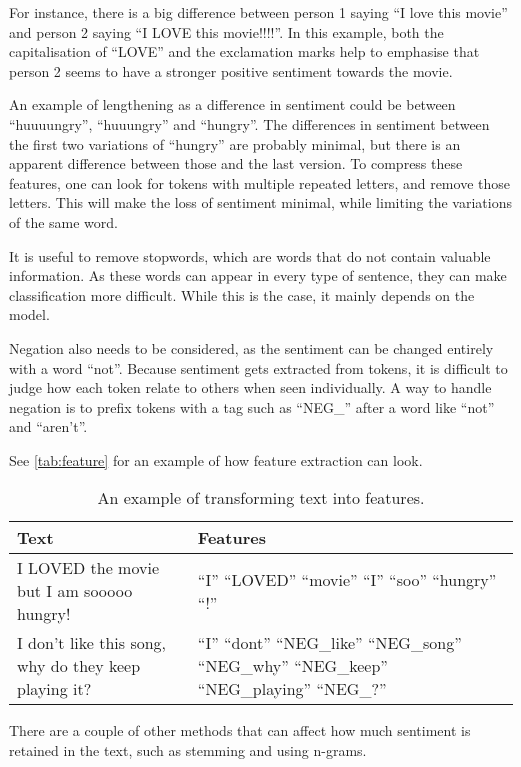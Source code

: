 For instance, there is a big difference between person 1 saying ``I love this
movie'' and person 2 saying ``I LOVE this movie!!!!''. In this example, both
the capitalisation of ``LOVE'' and the exclamation marks help to emphasise that
person 2 seems to have a stronger positive sentiment towards the movie.\nl

An example of lengthening as a difference in sentiment could be between
``huuuungry'', ``huuungry'' and ``hungry''. The differences in sentiment between
the first two variations of ``hungry'' are probably minimal, but there is an
apparent difference between those and the last version. To compress these
features, one can look for tokens with multiple repeated letters, and remove
those letters. This will make the loss of sentiment minimal, while limiting the
variations of the same word.\nl

It is useful to remove stopwords, which are words that do not contain valuable
information. As these words can appear in every type of sentence, they can make
classification more difficult. While this is the case, it mainly depends
on the model.\nl

Negation also needs to be considered, as the sentiment can be changed entirely
with a word ``not''. Because sentiment gets extracted from tokens, it is
difficult to judge how each token relate to others when seen individually. A way
to handle negation is to prefix tokens with a tag such as ``NEG\_'' after a word
like ``not'' and ``aren't''.\nl

See \autoref{tab:feature} for an example of how feature extraction can look.

\begin{table}[H]
\centering
\begin{tabular}{|p{6cm}|p{8cm}|}
\hline
Text & Features \\ \hline
I LOVED the movie but I am sooooo hungry! & 
``I'' ``LOVED'' ``movie'' ``I'' ``soo'' ``hungry'' ``!''
\\ \hline 
I don't like this song, why do they keep playing it? &
``I'' ``dont'' ``NEG\_like'' ``NEG\_song'' ``NEG\_why'' ``NEG\_keep''
``NEG\_playing'' ``NEG\_?'' \\ \hline
\end{tabular}
\caption{An example of transforming text into features.}
\label{tab:feature}
\end{table}

There are a couple of other methods that can affect how much sentiment is
retained in the text, such as stemming and using n-grams.

